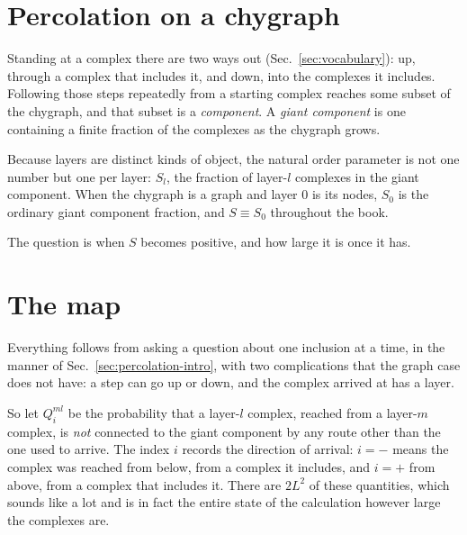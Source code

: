 \section{Percolation on a chygraph}
\label{sec:percolation-chygraph}

Standing at a complex there are two ways out (Sec.~\ref{sec:vocabulary}): up,
through a complex that includes it, and down, into the complexes it includes.
Following those steps repeatedly from a starting complex reaches some subset of
the chygraph, and that subset is a \emph{component}. A \emph{giant component} is
one containing a finite fraction of the complexes as the chygraph grows.

Because layers are distinct kinds of object, the natural order parameter is not
one number but one per layer: $S_{l}$, the fraction of layer-$l$ complexes in
the giant component. When the chygraph is a graph and layer $0$ is its nodes,
$S_{0}$ is the ordinary giant component fraction, and $S\equiv S_{0}$ throughout
the book.

The question is when $S$ becomes positive, and how large it is once it has.

\section{The map}
\label{sec:map}

Everything follows from asking a question about one inclusion at a time, in the
manner of Sec.~\ref{sec:percolation-intro}, with two complications that the
graph case does not have: a step can go up or down, and the complex arrived at
has a layer.

So let $Q^{ml}_{i}$ be the probability that a layer-$l$ complex, reached from a
layer-$m$ complex, is \emph{not} connected to the giant component by any route
other than the one used to arrive. The index $i$ records the direction of
arrival: $i=-$ means the complex was reached from below, from a complex it
includes, and $i=+$ from above, from a complex that includes it. There are
$2L^{2}$ of these quantities, which sounds like a lot and is in fact the entire
state of the calculation however large the complexes are.

